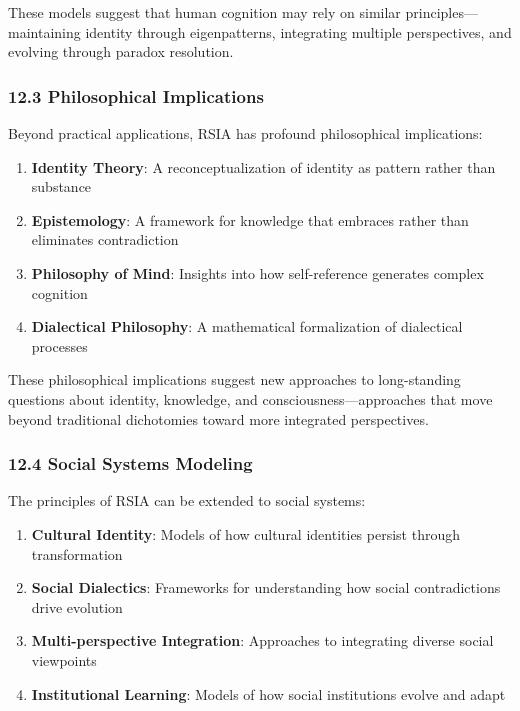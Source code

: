 \documentclass[12pt]{article}
\providecommand{\tightlist}{%
  \setlength{\itemsep}{0pt}\setlength{\parskip}{0pt}}
\begin{document}
These models suggest that human cognition may rely on similar
principles---maintaining identity through eigenpatterns, integrating
multiple perspectives, and evolving through paradox resolution.

\subsubsection{12.3 Philosophical
Implications}\label{philosophical-implications}

Beyond practical applications, RSIA has profound philosophical
implications:

\begin{enumerate}
\def\labelenumi{\arabic{enumi}.}
\tightlist
\item
  \textbf{Identity Theory}: A reconceptualization of identity as pattern
  rather than substance
\item
  \textbf{Epistemology}: A framework for knowledge that embraces rather
  than eliminates contradiction
\item
  \textbf{Philosophy of Mind}: Insights into how self-reference
  generates complex cognition
\item
  \textbf{Dialectical Philosophy}: A mathematical formalization of
  dialectical processes
\end{enumerate}

These philosophical implications suggest new approaches to long-standing
questions about identity, knowledge, and consciousness---approaches that
move beyond traditional dichotomies toward more integrated perspectives.

\subsubsection{12.4 Social Systems
Modeling}\label{social-systems-modeling}

The principles of RSIA can be extended to social systems:

\begin{enumerate}
\def\labelenumi{\arabic{enumi}.}
\tightlist{}
\item
  \textbf{Cultural Identity}: Models of how cultural identities persist
  through transformation
\item
  \textbf{Social Dialectics}: Frameworks for understanding how social
  contradictions drive evolution
\item
  \textbf{Multi-perspective Integration}: Approaches to integrating
  diverse social viewpoints
\item
  \textbf{Institutional Learning}: Models of how social institutions
  evolve and adapt
\end{enumerate}
\end{document}
